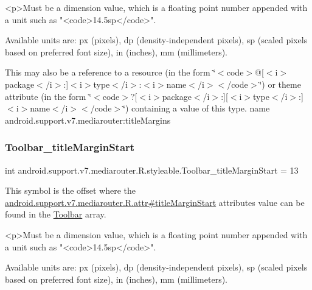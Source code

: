\begin{DoxyVerb}      <p>Must be a dimension value, which is a floating point number appended with a unit such as "<code>14.5sp</code>".
\end{DoxyVerb}
 Available units are\+: px (pixels), dp (density-\/independent pixels), sp (scaled pixels based on preferred font size), in (inches), mm (millimeters). 

This may also be a reference to a resource (in the form \char`\"{}$<$code$>$@\mbox{[}$<$i$>$package$<$/i$>$\+:\mbox{]}$<$i$>$type$<$/i$>$\+:$<$i$>$name$<$/i$>$$<$/code$>$\char`\"{}) or theme attribute (in the form \char`\"{}$<$code$>$?\mbox{[}$<$i$>$package$<$/i$>$\+:\mbox{]}\mbox{[}$<$i$>$type$<$/i$>$\+:\mbox{]}$<$i$>$name$<$/i$>$$<$/code$>$\char`\"{}) containing a value of this type.  name android.\+support.\+v7.\+mediarouter\+:title\+Margins \mbox{\label{classandroid_1_1support_1_1v7_1_1mediarouter_1_1R_1_1styleable_a3bb137bbd841404139f825faa9bdacb6}} 
\subsubsection{\texorpdfstring{Toolbar\+\_\+title\+Margin\+Start}{Toolbar\_titleMarginStart}}
{\footnotesize\ttfamily int android.\+support.\+v7.\+mediarouter.\+R.\+styleable.\+Toolbar\+\_\+title\+Margin\+Start = 13\hspace{0.3cm}{\ttfamily [static]}}

This symbol is the offset where the \hyperlink{classandroid_1_1support_1_1v7_1_1mediarouter_1_1R_1_1attr_a8a22c5883e8405e7b89aaf289111bafb}{android.\+support.\+v7.\+mediarouter.\+R.\+attr\#title\+Margin\+Start} attribute\textquotesingle{}s value can be found in the \hyperlink{classandroid_1_1support_1_1v7_1_1mediarouter_1_1R_1_1styleable_a6815cdfaadde30c82b955863af196899}{Toolbar} array.

\begin{DoxyVerb}      <p>Must be a dimension value, which is a floating point number appended with a unit such as "<code>14.5sp</code>".
\end{DoxyVerb}
 Available units are\+: px (pixels), dp (density-\/independent pixels), sp (scaled pixels based on preferred font size), in (inches), mm (millimeters). 

